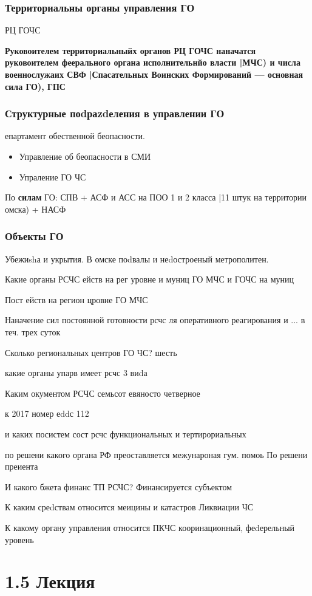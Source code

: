 \documentclass[oneside,final,14pt]{extreport}
\begin{document}
\subsection*{Территориальны органы управления ГО}

РЦ ГОЧС

\textbf{Руковоителем территориальныйх органов РЦ ГОЧС наначатся руковоителем феерального органа исполнительнйо власти |МЧС) и числа военнослужаих СВФ |Спасательных Воинских Формирований --- основная сила ГО), ГПС}

\subsection*{Структурные поdраzdеления в управлении ГО}

епартамент обественной беопасности.
\begin{itemize}
	\item Управление об беопасности в СМИ
	\item Упраление ГО ЧС
\end{itemize}

По \textbf{силам} ГО:
СПВ + АСФ и АСС на ПОО 1 и 2 класса |11 штук на территории омска) + НАСФ

\subsection*{Объекты ГО}

Убежиshа и укрытия. В омске поdвалы и неdостроеный метрополитен.

Какие органы РСЧС ейств на рег уровне и муниц
ГО МЧС и ГОЧС на муниц

Пост ейств на регион цровне
ГО МЧС

Наначение сил постоянной готовности рсчс
ля оперативного реагирования и ... в теч. трех суток

Сколько региональных центров ГО ЧС?
шесть

какие органы упарв имеет рсчс
3 виdа

Каким окументом РСЧС
семьсот евяносто четверное

к 2017 номер еddс
112

и каких посистем сост рсчс
функциональных и тертирориальных

по решени какого органа РФ преоставляется межунароная гум. помоь
По решени преиента

И какого бжета финанс ТП РСЧС?
Финансируется субъектом

К каким среdствам относится меицины и катастров
Ликвиации ЧС

К какому органу управления относится ПКЧС
кооринационный, феdерельный уровень








\chapter*{1.5 Лекция}
\end{document}
